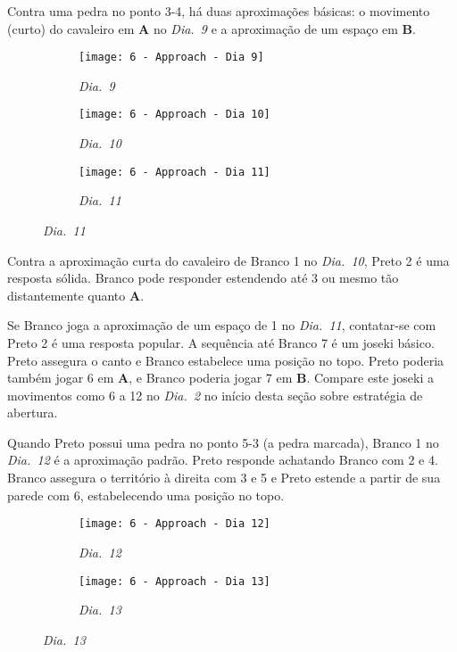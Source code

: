 \pagebreak

Contra uma pedra no ponto 3-4, há duas aproximações básicas: o movimento (curto) do cavaleiro em \textbf{A} no \emph{Dia.\@~9} e a aproximação de um espaço em \textbf{B}.

\begin{figure}[h!]
    \centering
    \begin{subfigure}[t]{.3\textwidth}
        \centering
        \texttt{[image: 6 - Approach - Dia 9]}
        \captionsetup{justification=centering}
        \caption*{\emph{Dia.\@~9}}
    \end{subfigure}
    \hfill
    \begin{subfigure}[t]{.3\textwidth}
        \centering
        \texttt{[image: 6 - Approach - Dia 10]}
        \captionsetup{justification=centering}
        \caption*{\emph{Dia.\@~10}}
    \end{subfigure}
    \hfill
    \begin{subfigure}[t]{.3\textwidth}
        \centering
        \texttt{[image: 6 - Approach - Dia 11]}
        \captionsetup{justification=centering}
        \caption*{\emph{Dia.\@~11}}
    \end{subfigure}
\end{figure}

Contra a aproximação curta do cavaleiro de Branco 1 no \emph{Dia.\@~10}, Preto 2 é uma resposta sólida. Branco pode responder estendendo até 3 ou mesmo tão distantemente quanto \textbf{A}.

Se Branco joga a aproximação de um espaço de 1 no \emph{Dia.\@~11}, contatar-se com Preto 2 é uma resposta popular. A sequência até Branco 7 é um joseki básico. Preto assegura o canto e Branco estabelece uma posição no topo. Preto poderia também jogar 6 em \textbf{A}, e Branco poderia jogar 7 em \textbf{B}. Compare este joseki a movimentos como 6 a 12 no \emph{Dia.\@~2} no início desta seção sobre estratégia de abertura.

\pagebreak

Quando Preto possui uma pedra no ponto 5-3 (a pedra marcada), Branco 1 no \emph{Dia.\@~12} é a aproximação padrão. Preto responde achatando Branco com 2 e 4. Branco assegura o território à direita com 3 e 5 e Preto estende a partir de sua parede com 6, estabelecendo uma posição no topo.

\begin{figure}[h!]
    \centering
    \begin{subfigure}[t]{.35\textwidth}
        \centering
        \texttt{[image: 6 - Approach - Dia 12]}
        \captionsetup{justification=centering}
        \caption*{\emph{Dia.\@~12}}
    \end{subfigure}
    \hspace{1cm}
    \begin{subfigure}[t]{.35\textwidth}
        \centering
        \texttt{[image: 6 - Approach - Dia 13]}
        \captionsetup{justification=centering}
        \caption*{\emph{Dia.\@~13}}
    \end{subfigure}
\end{figure}

